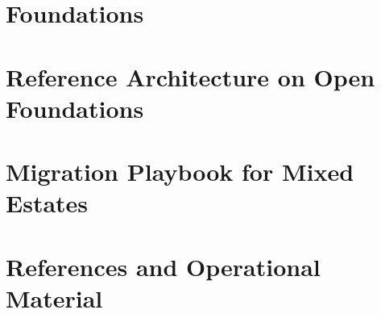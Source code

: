 


\part{Foundations}




\part{Reference Architecture on Open Foundations}













\part{Migration Playbook for Mixed Estates}















\part{References and Operational Material}




